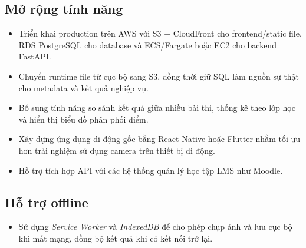 \subsection{Mở rộng tính năng}

\begin{itemize}
    \item Triển khai production trên AWS với S3 + CloudFront cho frontend/static file, RDS PostgreSQL cho database và ECS/Fargate hoặc EC2 cho backend FastAPI.
    \item Chuyển runtime file từ  cục bộ sang S3, đồng thời giữ SQL làm nguồn sự thật cho metadata và kết quả nghiệp vụ.
    \item Bổ sung tính năng so sánh kết quả giữa nhiều bài thi, thống kê theo lớp học và hiển thị biểu đồ phân phối điểm.
    \item Xây dựng ứng dụng di động gốc bằng React Native hoặc Flutter nhằm tối ưu hơn trải nghiệm sử dụng camera trên thiết bị di động.
    \item Hỗ trợ tích hợp API với các hệ thống quản lý học tập LMS như Moodle.
\end{itemize}

\subsection{Hỗ trợ offline}

\begin{itemize}
    \item Sử dụng \textit{Service Worker} và \textit{IndexedDB} để cho phép chụp ảnh và lưu cục bộ khi mất mạng, đồng bộ kết quả khi có kết nối trở lại.
\end{itemize}
